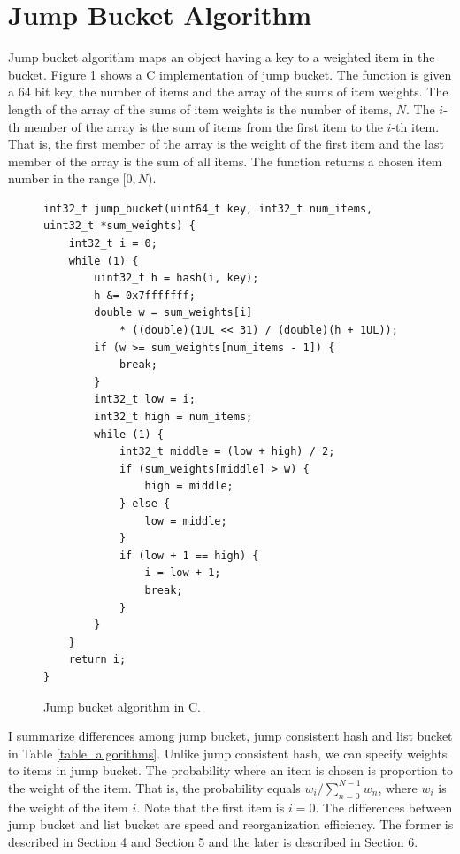 \documentclass[a4paper,11pt]{article}
\begin{document}
\section{Jump Bucket Algorithm}

Jump bucket algorithm maps an object having a key to a weighted item in the bucket.
Figure \ref{code_jumpbucket} shows a C implementation of jump bucket.
The function is given a 64 bit key, the number of items and the array of the sums of item weights.
The length of the array of the sums of item weights is the number of items, $N$.
The $i$-th member of the array is the sum of items from the first item to the $i$-th item.
That is, the first member of the array is the weight of the first item and the last member of the array is the sum of all items.
The function returns a chosen item number in the range $[0, N)$.

\begin{figure}[tbp]
\lstset{language=C}
\begin{footnotesize}
\begin{lstlisting}[frame=single]
int32_t jump_bucket(uint64_t key, int32_t num_items, uint32_t *sum_weights) {
    int32_t i = 0;
    while (1) {
        uint32_t h = hash(i, key);
        h &= 0x7fffffff;
        double w = sum_weights[i]
            * ((double)(1UL << 31) / (double)(h + 1UL));
        if (w >= sum_weights[num_items - 1]) {
            break;
        }
        int32_t low = i;
        int32_t high = num_items;
        while (1) {
            int32_t middle = (low + high) / 2;
            if (sum_weights[middle] > w) {
                high = middle;
            } else {
                low = middle;
            }
            if (low + 1 == high) {
                i = low + 1;
                break;
            }
        }
    }
    return i;
}
\end{lstlisting}
\end{footnotesize}
\caption{Jump bucket algorithm in C.}
\label{code_jumpbucket}
\end{figure}

I summarize differences among jump bucket, jump consistent hash and list bucket in Table \ref{table_algorithms}.
Unlike jump consistent hash, we can specify weights to items in jump bucket.
The probability where an item is chosen is proportion to the weight of the item.
That is, the probability equals $w_i / \sum_{n=0}^{N-1} w_n$, where $w_i$ is the weight of the item $i$.
Note that the first item is $i=0$.
The differences between jump bucket and list bucket are speed and reorganization efficiency.
The former is described in Section 4 and Section 5 and the later is described in Section 6.
\end{document}
